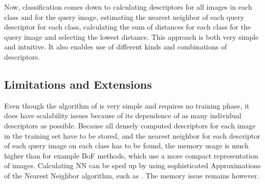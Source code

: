 Now, classification comes down to calculating descriptors for all images in each class and for the query image, estimating the nearest neighbor of each query descriptor for each class, calculating the sum of distances for each class for the query image and selecting the lowest distance. This approach is both very simple and intuitive. It also enables use of different kinds and combinations of descriptors.



\subsection{Limitations and Extensions} %
\label{sub:limitations_and_extensions}

Even though the algorithm of \cite{boiman2008defense} is very simple and requires no training phase, it does have scalability issues because of its dependence of as many individual descriptors as possible. Because all densely computed descriptors for each image in the training set have to be stored, and the nearest neighbor for each descriptor of each query image on each class has to be found, the memory usage is much higher than for example BoF methods, which use a more compact representation of images. Calculating NN can be sped up by using sophisticated Approximations of the Nearest Neighbor algorithm, such as . The memory issue remains however.

